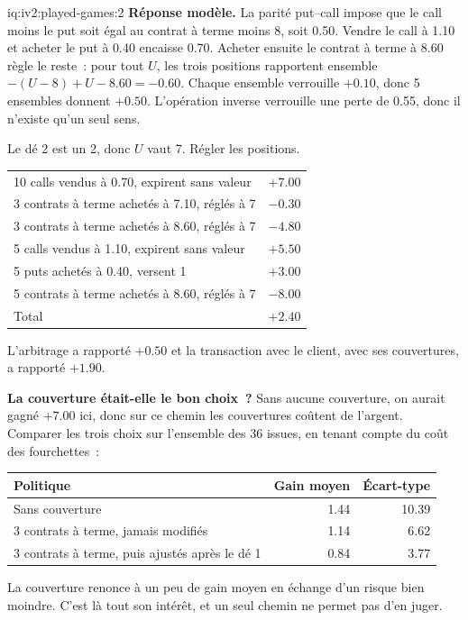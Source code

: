 \begin{solution}{iq:iv2:played-games:2}
\textbf{Réponse modèle.} La parité put--call impose que le call moins le put soit égal au contrat à terme moins 8, soit 0.50. Vendre le call à 1.10 et acheter le put à 0.40 encaisse 0.70. Acheter ensuite le contrat à terme à 8.60 règle le reste~: pour tout $U$, les trois positions rapportent ensemble $-(U - 8) + U - 8.60 = -0.60$. Chaque ensemble verrouille $+0.10$, donc 5 ensembles donnent $+0.50$. L'opération inverse verrouille une perte de 0.55, donc il n'existe qu'un seul sens.

Le dé 2 est un 2, donc $U$ vaut 7. Régler les positions.
\ivstop

\begin{center}\small
\begin{tabular}{@{}lr@{}}
10 calls vendus à 0.70, expirent sans valeur & $+7.00$ \\
3 contrats à terme achetés à 7.10, réglés à 7 & $-0.30$ \\
3 contrats à terme achetés à 8.60, réglés à 7 & $-4.80$ \\
5 calls vendus à 1.10, expirent sans valeur & $+5.50$ \\
5 puts achetés à 0.40, versent 1 & $+3.00$ \\
5 contrats à terme achetés à 8.60, réglés à 7 & $-8.00$ \\ \hline
Total & $+2.40$
\end{tabular}
\end{center}
L'arbitrage a rapporté $+0.50$ et la transaction avec le client, avec ses couvertures, a rapporté $+1.90$.

\textbf{La couverture était-elle le bon choix~?} Sans aucune couverture, on aurait gagné $+7.00$ ici, donc sur ce chemin les couvertures coûtent de l'argent. Comparer les trois choix sur l'ensemble des 36 issues, en tenant compte du coût des fourchettes~:
\begin{center}\small
\begin{tabular}{@{}lrr@{}}
Politique & Gain moyen & Écart-type \\ \hline
Sans couverture & 1.44 & 10.39 \\
3 contrats à terme, jamais modifiés & 1.14 & 6.62 \\
3 contrats à terme, puis ajustés après le dé 1 & 0.84 & 3.77
\end{tabular}
\end{center}
La couverture renonce à un peu de gain moyen en échange d'un risque bien moindre. C'est là tout son intérêt, et un seul chemin ne permet pas d'en juger.


\end{solution}
